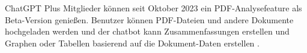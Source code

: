 ChatGPT Plus Mitglieder können seit Oktober 2023 ein PDF-Analysefeature als Beta-Version genießen. Benutzer können PDF-Dateien und andere Dokumente hochgeladen werden und der chatbot kann Zusammenfassungen erstellen und Graphen oder Tabellen basierend auf die Dokument-Daten erstellen \cite{hackernoon-claude}.

